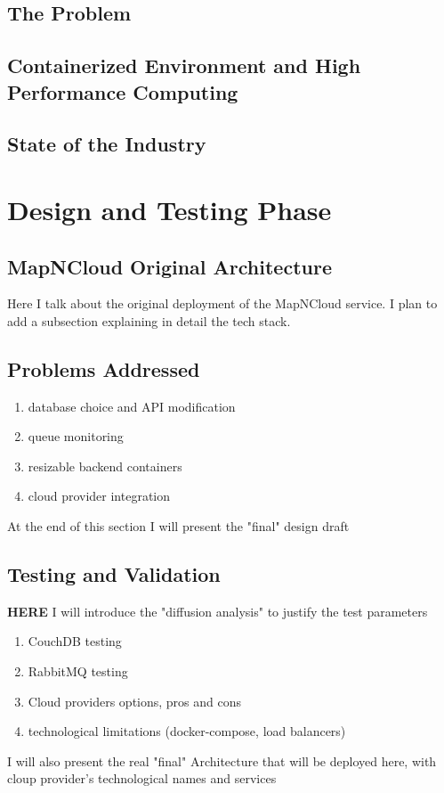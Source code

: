 \documentclass{Configuration_Files/PoliMi3i_thesis}
\begin{document}
    \section{The Problem}
		\label{se:problem}
    
	
		\section{Containerized Environment and High Performance Computing}
		\label{se:containerHPC}
    
		
		\section{State of the Industry}
		\label{se:stateoftheart}
    			
		
	\chapter{Design and Testing Phase}
	\label{ch:designandtesting}

		\section{MapNCloud Original Architecture}
		\label{se:originalarchitecture}
			Here I talk about the original deployment of the MapNCloud service. I plan to add a subsection explaining in detail the tech stack.

		\section{Problems Addressed}
		\label{se:problemaddressed}
			\begin{enumerate}
				\item database choice and API modification
				\item queue monitoring
				\item resizable backend containers
				\item cloud provider integration
			\end{enumerate}
			At the end of this section I will present the "final" design draft
		
		\section{Testing and Validation}
		\label{se:testingvalidation}
			\textbf{HERE} I will introduce the "diffusion analysis" to justify the test parameters
			\begin{enumerate}
				\item CouchDB testing
				\item RabbitMQ testing
				\item Cloud providers options, pros and cons
				\item technological limitations (docker-compose, load balancers)
			\end{enumerate}
			I will also present the real "final" Architecture that will be deployed here, with cloup provider's technological names and services
	
\end{document}
